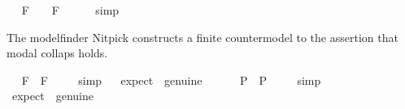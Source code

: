 \begin{isabellebody}
{}
%
\endisatagproof
{\isafoldproof}%
%
\isadelimproof
%
\endisadelimproof
\isanewline
\ \isamarkupfalse%
\ {\isachardoublequoteopen}{\isacharbrackleft}{\isasymphi}\isactrlsup F{\isacharbrackright}\ {\isacharequal}\ {\isasymtop}\ {\isasymlongrightarrow}\ {\isacharbrackleft}\isactrlbold {\isasymbox}{\isasymphi}\isactrlsup F{\isacharbrackright}\ {\isacharequal}\ {\isasymtop}\ {\isachardoublequoteclose}%
\isadelimproof
\ %
\endisadelimproof
%
\isatagproof
{}\isamarkupfalse%
\ simp\ \isamarkupfalse%
\ \ \ \ %
%
\endisatagproof
{\isafoldproof}%
%
\isadelimproof
%
\endisadelimproof
%
\isamarkuptrue%
%
\begin{isamarkuptext}%
The modelfinder Nitpick constructs a finite countermodel to the assertion
  that modal collaps holds.%
\end{isamarkuptext}%
\isamarkuptrue%
\ \isamarkupfalse%
\ {\isachardoublequoteopen}{\isacharbrackleft}{\isasymphi}\isactrlsup F\ \isactrlbold {\isasymrightarrow}\ \isactrlbold {\isasymbox}{\isasymphi}\isactrlsup F{\isacharbrackright}\ {\isacharequal}\ {\isasymtop}{\isachardoublequoteclose}%
\isadelimproof
\ %
\endisadelimproof
%
\isatagproof
{}\isamarkupfalse%
\ simp%
\endisatagproof
{\isafoldproof}%
%
\isadelimproof
%
\endisadelimproof
\ \isamarkupfalse%
\ {\isacharbrackleft}expect\ {\isacharequal}\ genuine{\isacharbrackright}%
\isadelimproof
\ %
\endisadelimproof
%
\isatagproof
{}\isamarkupfalse%
\ %
%
\endisatagproof
{\isafoldproof}%
%
\isadelimproof
%
\endisadelimproof
\isanewline
\ \isamarkupfalse%
\ {\isachardoublequoteopen}{\isacharbrackleft}{\isasymphi}\isactrlsup P\ \isactrlbold {\isasymrightarrow}\ \isactrlbold {\isasymbox}{\isasymphi}\isactrlsup P{\isacharbrackright}\ {\isacharequal}\ {\isasymtop}{\isachardoublequoteclose}%
\isadelimproof
\ %
\endisadelimproof
%
\isatagproof
{}\isamarkupfalse%
\ simp%
\endisatagproof
{\isafoldproof}%
%
\isadelimproof
%
\endisadelimproof
\ \isamarkupfalse%
\ {\isacharbrackleft}expect\ {\isacharequal}\ genuine{\isacharbrackright}%
\isadelimproof
\ %
\endisadelimproof
%
\isatagproof
{}\isamarkupfalse%
\ %
%
\endisatagproof
{\isafoldproof}%
%
\isadelimproof
%
\endisadelimproof
%
\isamarkuptrue%
%
\begin{isamarkuptext}%

\end{isamarkuptext}
\end{isabellebody}
